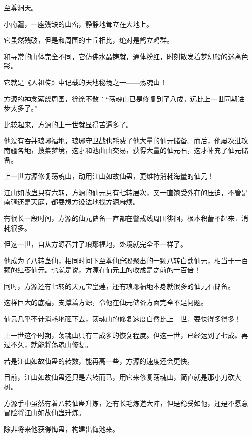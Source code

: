 
\begin{this_body}



至尊洞天。

小南疆，一座残缺的山峦，静静地耸立在大地上。

它虽然残破，但是和周围的土丘相比，绝对是鹤立鸡群。

和寻常的山体完全不同，它仿佛水晶铸就，通体粉红，时刻散发着梦幻般的迷离色彩。

它就是《人祖传》中记载的天地秘境之一——荡魂山！

方源的神念萦绕周围，徐徐不散：“荡魂山已是修复到了八成，远比上一世同期进步太多了。”

比较起来，方源的上一世就显得苦逼多了。

他没有吞并琅琊福地，琅琊守卫战也耗费了他大量的仙元储备。而后，他屡次进攻南疆各地，搜集梦境，这才和池曲由交易，获得大量的仙元石，这才补充了仙元储备。

上一世方源修复荡魂山，动用江山如故仙蛊，更维持消耗海量的仙元！

江山如故蛊只有六转，方源的仙元只有七转层次，又一直饱受外在的压迫，不管是南疆还是天庭，都要想方设法地找方源麻烦。

有很长一段时间，方源的仙元储备一直都在警戒线周围徘徊，根本积蓄不起来，消耗很多。

但这一世，自从方源吞并了琅琊福地，处境就完全不一样了。

他成为了八转蛊仙，相同时间下至尊仙窍凝聚出的一颗八转白荔仙元，相当于一百颗的红枣仙元。也就是说，方源在仙元上的收成是之前的一百倍！

同时，方源还有七转的天元宝皇莲，还有琅琊福地本身就很多的仙元石储备。

这样巨大的底蕴，支撑着方源，令他在仙元储备方面完全不是问题。

仙元几乎不计消耗地砸下去，荡魂山的修复速度自然比上一世，要快得多得多！

上一世这个时期，荡魂山只有三成多的恢复程度。但这一世，已经达到了七成。再过不久，就能将荡魂山修复。

若是江山如故仙蛊的转数，能再高一些，方源的速度还会更快。

目前，江山如故仙蛊还只是六转而已，用它来修复荡魂山，简直就是那小刀砍大树。

方源手中虽然有着八转仙蛊升炼，还有长毛炼道大阵，但是稳妥如他，还是不愿意冒险将江山如故仙蛊升炼。

除非将来他获得悔蛊，构建出悔池来。


\end{this_body}
